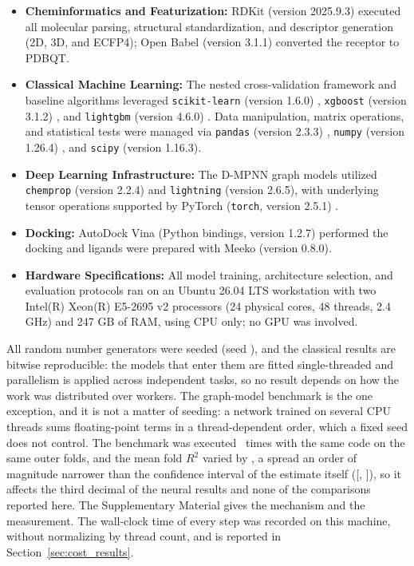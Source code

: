 \begin{itemize}
	\item \textbf{Cheminformatics and Featurization:} RDKit (version 2025.9.3) \citep{landrum2025} executed all molecular parsing, structural standardization, and descriptor generation (2D, 3D, and ECFP4); Open Babel (version 3.1.1) \citep{babel2011} converted the receptor to PDBQT.
	\item \textbf{Classical Machine Learning:} The nested cross-validation framework \citep{krstajic2014, calle2025} and baseline algorithms leveraged \texttt{scikit-learn} (version 1.6.0) \citep{pedregosa2011sklearn}, \texttt{xgboost} (version 3.1.2) \citep{chengeustrin2016XGBoost}, and \texttt{lightgbm} (version 4.6.0) \citep{kemeng2017LightGBM}. Data manipulation, matrix operations, and statistical tests were managed via \texttt{pandas} (version 2.3.3) \citep{mckinney2010pandas}, \texttt{numpy} (version 1.26.4) \citep{harris2020numpy}, and \texttt{scipy} (version 1.16.3).
	\item \textbf{Deep Learning Infrastructure:} The D-MPNN graph models utilized \texttt{chemprop} (version 2.2.4) \citep{graff2026, heid2024} and \texttt{lightning} (version 2.6.5), with underlying tensor operations supported by PyTorch (\texttt{torch}, version 2.5.1) \citep{paszke2019pytorch}.
	\item \textbf{Docking:} AutoDock Vina (Python bindings, version 1.2.7) \citep{trott2009} performed the docking and ligands were prepared with Meeko (version 0.8.0).
	\item \textbf{Hardware Specifications:} All model training, architecture selection, and evaluation protocols ran on an Ubuntu 26.04 LTS workstation with two Intel(R) Xeon(R) E5-2695 v2 processors (24 physical cores, 48 threads, 2.4 GHz) and 247 GB of RAM, using CPU only; no GPU was involved.
\end{itemize}

All random number generators were seeded (seed \RandomSeed), and the classical results are bitwise reproducible: the models that
enter them are fitted single-threaded and parallelism is applied across independent tasks, so no result depends on how
the work was distributed over workers. The graph-model benchmark is the one exception, and it is not a matter of
seeding: a network trained on several CPU threads sums floating-point terms in a thread-dependent order, which a fixed
seed does not control. The benchmark was executed \GnnRepeatNRuns\ times with the same code on the same outer
folds, and the mean fold $R^2$ varied by \GnnRepeatRTwoRange, a spread an order of magnitude narrower than the
confidence interval of the estimate itself
([\ChemPropDMPNNFoldCILow, \ChemPropDMPNNFoldCIHigh]), so it affects the third decimal of the neural results and none
of the comparisons reported here. The Supplementary Material gives the mechanism and the measurement. The wall-clock
time of every step was recorded on this machine, without normalizing by thread count, and is reported in
Section~\ref{sec:cost_results}.
